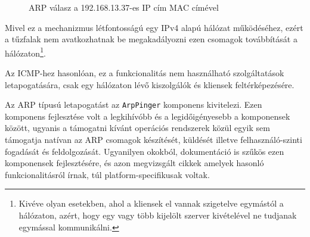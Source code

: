 	\begin{figure}[!htbp]
		\centering
		\caption{ARP válasz a 192.168.13.37-es IP cím MAC címével}
		\label{arpresp}
	\end{figure}

	Mivel ez a mechanizmus létfontosságú egy IPv4 alapú hálózat működéséhez, ezért a tűzfalak nem avatkozhatnak be megakadályozni ezen csomagok továbbítását a hálózaton\footnote{Kivéve olyan esetekben, ahol a kliensek el vannak szigetelve egymástól a hálózaton, azért, hogy egy vagy több kijelölt szerver kivételével ne tudjanak egymással kommunikálni.}.
	
	Az ICMP-hez hasonlóan, ez a funkcionalitás nem használható szolgáltatások letapogatására, csak egy hálózaton lévő kiszolgálók és kliensek feltérképezésére.
	

	Az ARP típusú letapogatást az \texttt{ArpPinger} komponens kivitelezi. Ezen komponens fejlesztése volt a legkihívóbb és a legidőigényesebb a komponensek között, ugyanis a támogatni kívánt operációs rendszerek közül egyik sem támogatja natívan az ARP csomagok készítését, küldését illetve felhasználó-szinti fogadását és feldolgozását. Ugyanilyen okokból, dokumentáció is szűkös ezen komponensek fejlesztésére, és azon megvizsgált cikkek amelyek hasonló funkcionalitásról írnak, túl platform-specifikusak voltak.
	
